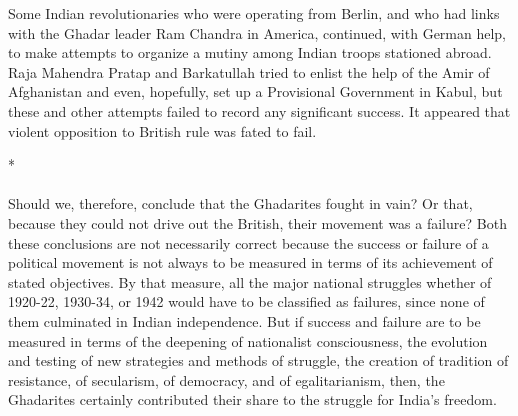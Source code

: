 Some Indian revolutionaries who were operating from Berlin, and who had links with the Ghadar leader Ram Chandra in America, continued, with German help, to make attempts to organize a mutiny among Indian troops stationed abroad. Raja Mahendra Pratap and Barkatullah tried to enlist the help of the Amir of Afghanistan and even, hopefully, set up a Provisional Government in Kabul, but these and other attempts failed to record any significant success. It appeared that violent opposition to British rule was fated to fail.

\begin{center}*\end{center}

\paragraph*{}


Should we, therefore, conclude that the Ghadarites fought in vain? Or that, because they could not drive out the British, their movement was a failure? Both these conclusions are not necessarily correct because the success or failure of a political movement is not always to be measured in terms of its achievement of stated objectives. By that measure, all the major national struggles whether of 1920-22, 1930-34, or 1942 would have to be classified as failures, since none of them culminated in Indian independence. But if success and failure are to be measured in terms of the deepening of nationalist consciousness, the evolution and testing of new strategies and methods of struggle, the creation of tradition of resistance, of secularism, of democracy, and of egalitarianism, then, the Ghadarites certainly contributed their share to the struggle for India's freedom.

